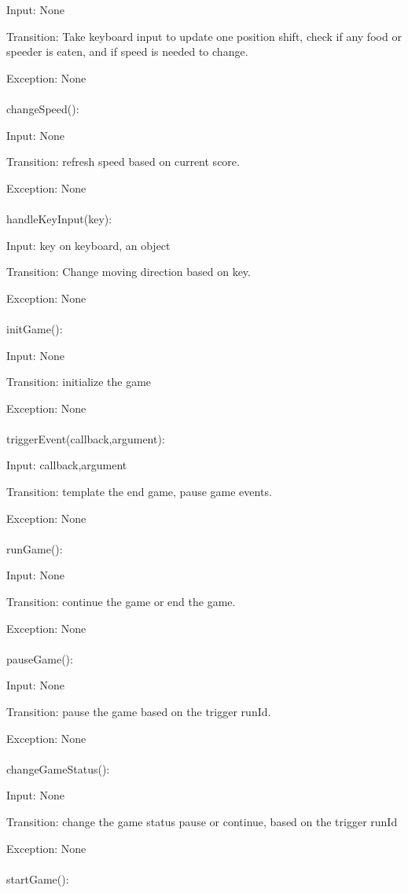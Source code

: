 \documentclass[12pt, titlepage]{article}
\begin{document}
		Input: None
		
		Transition: Take keyboard input to update one position shift, check 
if any food or speeder is eaten, and if speed is needed to change.
				
		Exception: None\\
		\\
		changeSpeed():
		
		Input: None
		
		Transition: refresh speed based on current score. 
				
		Exception: None\\
		\\
		handleKeyInput(key):
		
		Input: key on keyboard, an object
		
		Transition: Change moving direction 
based on key.
				
		Exception: None\\
		\\
		initGame():
		
		Input: None
		
		Transition: initialize the game
				
		Exception: None\\
		\\
		triggerEvent(callback,argument):
		
		Input: callback,argument
		
		Transition: template the end game, pause game events.
				
		Exception: None\\
		\\
		runGame():
		
		Input: None
		
		Transition: continue the game or end the game.
				
		Exception: None\\
		\\
		pauseGame():
		
		Input: None
		
		Transition: pause the game based on the trigger runId.
				
		Exception: None\\
		\\
		changeGameStatus():
		
		Input: None
		
		Transition: change the game status pause or continue, based on the trigger runId
				
		Exception: None\\
		\\
		startGame():
		
\end{document}
